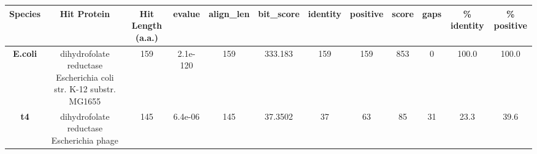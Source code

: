 \begin{tabular}{|c|c|c|c|c|c|c|c|c|c|c|c|} \hline
\textbf{Species} & \textbf{Hit Protein} & \textbf{Hit Length (a.a.)} & \textbf{evalue} & \textbf{align\_len} & \textbf{bit\_score} & \textbf{identity} & \textbf{positive} & \textbf{score} & \textbf{gaps} & \textbf{\% identity} & \textbf{\% positive} \\ \hline
\textbf{E.coli} & dihydrofolate reductase Escherichia coli str. K-12 substr. MG1655 & 159 & 2.1e-120 & 159 & 333.183 & 159 & 159 & 853 & 0 & 100.0 & 100.0\\
\textbf{t4} & dihydrofolate reductase Escherichia phage  & 145 & 6.4e-06 & 145 & 37.3502 & 37 & 63 & 85 & 31 & 23.3 & 39.6\\
\hline \end{tabular}
